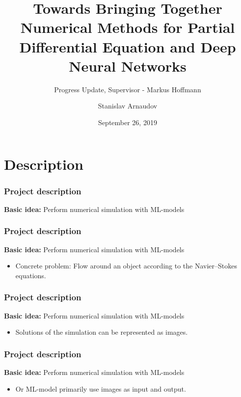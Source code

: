 \documentclass[18pt]{beamer}
\title[Progress Update]{Towards Bringing Together Numerical Methods for Partial Differential Equation and Deep Neural Networks}
\subtitle{Progress Update, Supervisor - Markus Hoffmann}
\author{Stanislav Arnaudov}
\institute{Chair for Computer Architecture and Parallel Processing}
\date{September 26, 2019}
\begin{document}
\begin{frame}
 \titlepage
\end{frame}



\begin{frame}
 \titlepage
\end{frame}


\section{Description}

\begin{frame}[t]
  \frametitle{Project description}
  \begin{center}
    \large{\textbf{Basic idea:} Perform numerical simulation with ML-models}
  \end{center}
\end{frame}


\begin{frame}[t]
  \frametitle{Project description}
  \begin{center}
    \large{\textbf{Basic idea:} Perform numerical simulation with ML-models}
  \end{center}
  
  \begin{itemize}
  \item Concrete problem: Flow around an object according to the Navier–Stokes equations.
  \end{itemize}
\end{frame}

\begin{frame}[t]
  \frametitle{Project description}
  \begin{center}
    \large{\textbf{Basic idea:} Perform numerical simulation with ML-models}
  \end{center}
  \begin{itemize}
  \item Solutions of the simulation can be represented as images.
  \end{itemize}
\end{frame}


\begin{frame}[t]
  \frametitle{Project description}
  \begin{center}
    \large{\textbf{Basic idea:} Perform numerical simulation with ML-models}
  \end{center}
  
  \begin{itemize}
  \item Or ML-model primarily use images as input and output.
  \end{itemize}
\end{frame}
\end{document}
